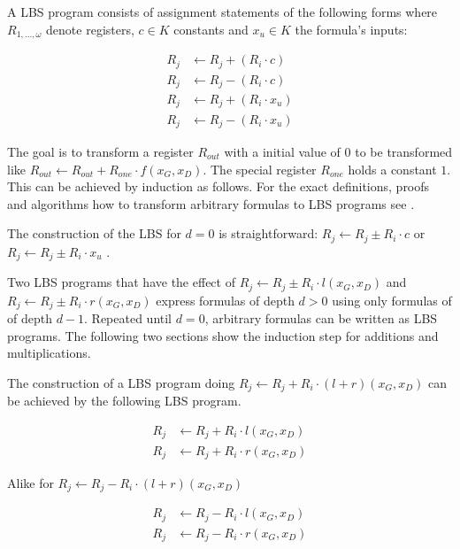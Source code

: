 A LBS program consists of assignment statements of the following
forms where $R_{1,...,\omega}$ denote registers, $c \in K$ constants and $x_u
\in K$ the formula's inputs:

\begin{align*}
R_j & \leftarrow R_j + (R_i \cdot c) \\
R_j & \leftarrow R_j - (R_i \cdot c) \\
R_j & \leftarrow R_j + (R_i \cdot x_u) \\
R_j & \leftarrow R_j - (R_i \cdot x_u)
\end{align*}



The goal is to transform a register $R_{out}$ with a initial value of $0$ to be
transformed like $R_{out} \leftarrow R_{out} + R_{one} \cdot f(x_G,x_D)$. The
special register $R_{one}$ holds a constant $1$. This can be achieved by
induction as follows.  For the exact definitions, proofs and algorithms how to
transform arbitrary formulas to LBS programs see \cite{cleve91}.



The construction of the LBS for $d = 0$ is straightforward:
$R_j \leftarrow R_j \pm R_i \cdot c$ or $R_j \leftarrow R_j \pm R_i \cdot x_u$ .



Two LBS programs that have the effect of $R_j \leftarrow R_j \pm R_i \cdot
l(x_G, x_D)$  and $R_j \leftarrow R_j \pm R_i \cdot r(x_G, x_D)$ express
formulas of depth $d > 0$ using only formulas of of depth $d - 1$. Repeated
until $d = 0$, arbitrary formulas can be written as LBS programs. The following
two sections show the induction step for additions and multiplications.

 The construction of a LBS program doing $R_j \leftarrow R_j
+ R_i \cdot (l + r)(x_G, x_D)$ can be achieved by the following LBS program.

\begin{align*}
R_j & \leftarrow R_j + R_i \cdot l(x_G, x_D) \\
R_j & \leftarrow R_j + R_i \cdot r(x_G, x_D)
\end{align*}

Alike for $R_j \leftarrow R_j - R_i \cdot (l + r)(x_G, x_D)$

\begin{align*}
R_j & \leftarrow R_j - R_i \cdot l(x_G, x_D) \\
R_j & \leftarrow R_j - R_i \cdot r(x_G, x_D)
\end{align*}


